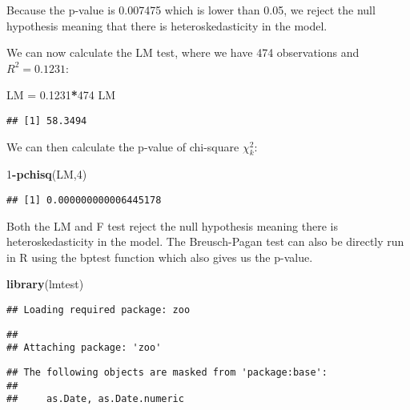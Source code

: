 \documentclass[
]{article}
\newenvironment{Shaded}{\begin{snugshade}}{\end{snugshade}}
\newcommand{\DecValTok}[1]{\textcolor[rgb]{0.00,0.00,0.81}{#1}}
\newcommand{\FloatTok}[1]{\textcolor[rgb]{0.00,0.00,0.81}{#1}}
\newcommand{\FunctionTok}[1]{\textcolor[rgb]{0.13,0.29,0.53}{\textbf{#1}}}
\newcommand{\NormalTok}[1]{#1}
\newcommand{\OtherTok}[1]{\textcolor[rgb]{0.56,0.35,0.01}{#1}}
\newcommand{\SpecialCharTok}[1]{\textcolor[rgb]{0.81,0.36,0.00}{\textbf{#1}}}
\begin{document}
Because the p-value is 0.007475 which is lower than 0.05, we reject the
null hypothesis meaning that there is heteroskedasticity in the model.

We can now calculate the LM test, where we have 474 observations and
\(R^2=0.1231\):

\begin{Shaded}
\begin{Highlighting}[]
\NormalTok{LM }\OtherTok{=} \FloatTok{0.1231}\SpecialCharTok{*}\DecValTok{474}
\NormalTok{LM}
\end{Highlighting}
\end{Shaded}

\begin{verbatim}
## [1] 58.3494
\end{verbatim}

We can then calculate the p-value of chi-square \(\chi^2_k\):

\begin{Shaded}
\begin{Highlighting}[]
\DecValTok{1}\SpecialCharTok{{-}}\FunctionTok{pchisq}\NormalTok{(LM,}\DecValTok{4}\NormalTok{)}
\end{Highlighting}
\end{Shaded}

\begin{verbatim}
## [1] 0.000000000006445178
\end{verbatim}

Both the LM and F test reject the null hypothesis meaning there is
heteroskedasticity in the model. The Breusch-Pagan test can also be
directly run in R using the bptest function which also gives us the
p-value.

\begin{Shaded}
\begin{Highlighting}[]
\FunctionTok{library}\NormalTok{(lmtest)}
\end{Highlighting}
\end{Shaded}

\begin{verbatim}
## Loading required package: zoo
\end{verbatim}

\begin{verbatim}
## 
## Attaching package: 'zoo'
\end{verbatim}

\begin{verbatim}
## The following objects are masked from 'package:base':
## 
##     as.Date, as.Date.numeric
\end{verbatim}
\end{document}
